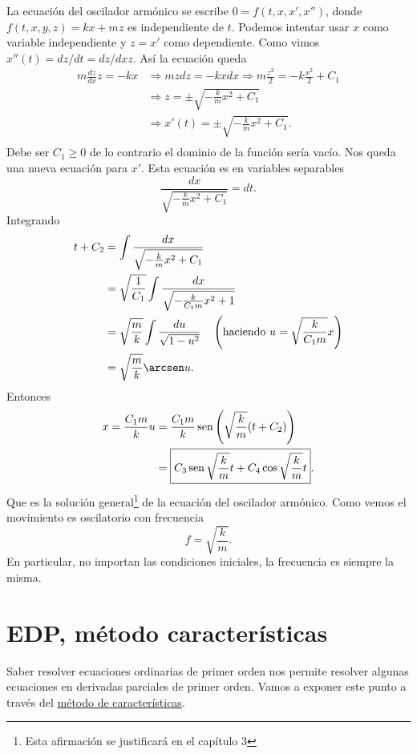 La ecuación del oscilador armónico se escribe $0=f(t,x,x',x'')$, donde \linebreak $f(t,x,y,z)=kx+mz$ es independiente de $t$. Podemos intentar usar $x$ como variable
independiente y $z=x'$ como dependiente. Como vimos  $x''(t)=dz/dt=dz/dx z$. Así la ecuación queda
\[\begin{split}
   m\frac{dz}{dx}z=-kx &\Longrightarrow mzdz=-kxdx\Longrightarrow m\frac{z^2}{2}=-k\frac{x^2}{2}+C_1\\
   &\Longrightarrow z=\pm\sqrt{-\frac{k}{m}x^2+C_1}\\
   &\Longrightarrow x'(t)=\pm\sqrt{-\frac{k}{m}x^2+C_1}.\\
  \end{split}
\]
Debe ser $C_1\geq 0$ de lo contrario el dominio de la función sería vacío. Nos queda una nueva ecuación para $x'$.
Esta ecuación es en variables separables
\[ \frac{dx}{\sqrt{-\frac{k}{m}x^2+C_1}}=dt.
\]
 Integrando
\[\begin{split}
   t+C_2
   &=\int \frac{dx}{\sqrt{-\frac{k}{m}x^2+C_1}}\\
   &= \sqrt{\frac{1}{C_1}} \int \frac{dx}{\sqrt{-\frac{k}{C_1m}x^2+1}} \\
   &= \sqrt{\frac{m}{k}} \int \frac{du}{\sqrt{1-u^2}}\quad \left(\text{haciendo } u=\sqrt{\frac{k}{C_1m}}x\right)\\
   &=\sqrt{\frac{m}{k}}\arcsen u.
  \end{split}
\]
Entonces
\[\begin{split}
    x=\frac{C_1m}{k}u &=\frac{C_1m}{k}\sen \left(\sqrt{\frac{k}{m}}(t+C_2)\right)\\
    &=\boxed{C_3\sen \sqrt{\frac{k}{m}}t+C_4\cos \sqrt{\frac{k}{m}}t}.
  \end{split}
 \]
Que es la solución general\footnote{Esta afirmación se justificará en el capítulo 3}  de la ecuación del oscilador armónico. Como vemos el movimiento es oscilatorio con frecuencia
\[\boxed{f=\sqrt{\frac{k}{m}} }.\]
En particular, no importan las condiciones iniciales, la frecuencia es siempre la misma.






\section{EDP, método características}

Saber resolver ecuaciones ordinarias de primer orden nos permite resolver algunas ecuaciones en derivadas parciales de primer orden.  Vamos a exponer este punto a través del \href{https://en.wikipedia.org/wiki/Method_of_characteristics}{método de características}.

